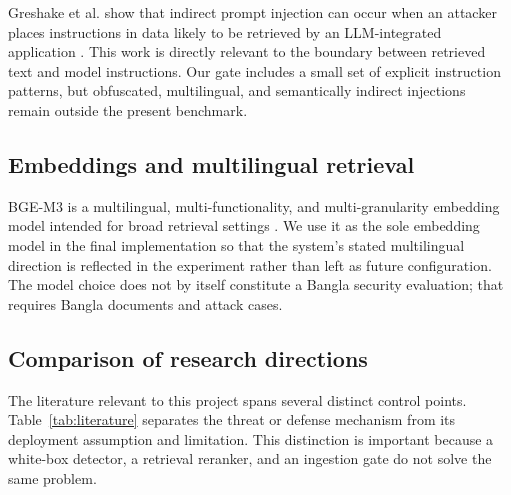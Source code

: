 \documentclass[conference]{IEEEtran}
\begin{document}
Greshake et al. show that indirect prompt injection can occur when an attacker places instructions in data likely to be retrieved by an LLM-integrated application \cite{greshake2023indirect}. This work is directly relevant to the boundary between retrieved text and model instructions. Our gate includes a small set of explicit instruction patterns, but obfuscated, multilingual, and semantically indirect injections remain outside the present benchmark.

\subsection{Embeddings and multilingual retrieval}
BGE-M3 is a multilingual, multi-functionality, and multi-granularity embedding model intended for broad retrieval settings \cite{chen2024bgem3}. We use it as the sole embedding model in the final implementation so that the system's stated multilingual direction is reflected in the experiment rather than left as future configuration. The model choice does not by itself constitute a Bangla security evaluation; that requires Bangla documents and attack cases.

\subsection{Comparison of research directions}
The literature relevant to this project spans several distinct control points. Table~\ref{tab:literature} separates the threat or defense mechanism from its deployment assumption and limitation. This distinction is important because a white-box detector, a retrieval reranker, and an ingestion gate do not solve the same problem.
\end{document}
